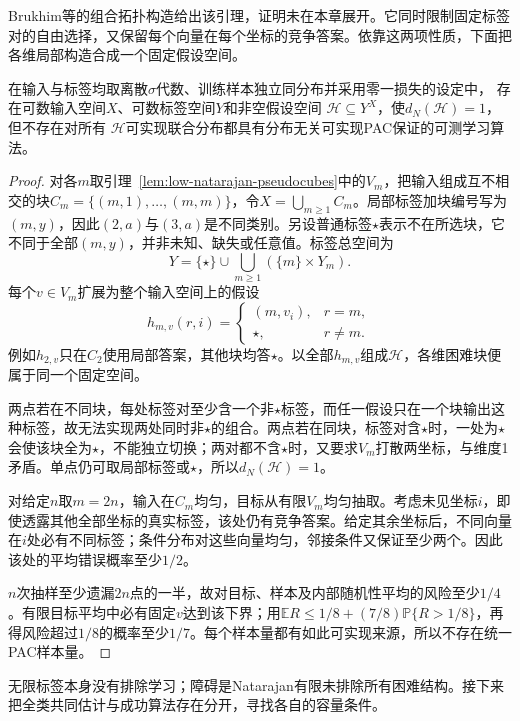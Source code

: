 Brukhim等的组合拓扑构造给出该引理，证明未在本章展开。它同时限制固定标签对的自由选择，又保留每个向量在每个坐标的竞争答案。依靠这两项性质，下面把各维局部构造合成一个固定假设空间。

\begin{theorem}[无限标签下有限Natarajan维并不充分]
\label{thm:natarajan-infinite-counterexample}
在输入与标签均取离散$\sigma$代数、训练样本独立同分布并采用零一损失的设定中，
存在可数输入空间$X$、可数标签空间$Y$和非空假设空间
$\mathcal H\subseteq Y^X$，使$d_N(\mathcal H)=1$，但不存在对所有
$\mathcal H$可实现联合分布都具有分布无关可实现PAC保证的可测学习算法。
\end{theorem}

\begin{proof}
对各$m$取引理~\ref{lem:low-natarajan-pseudocubes}中的$V_m$，把输入组成互不相交的块$C_m=\{(m,1),\ldots,(m,m)\}$，令$X=\bigcup_{m\geq1}C_m$。局部标签加块编号写为$(m,y)$，因此$(2,a)$与$(3,a)$是不同类别。另设普通标签$\star$表示不在所选块，它不同于全部$(m,y)$，并非未知、缺失或任意值。标签总空间为
\[
 Y=\{\star\}\cup\bigcup_{m\geq1}(\{m\}\times Y_m).
\]
每个$v\in V_m$扩展为整个输入空间上的假设
\[
 h_{m,v}(r,i)=
 \begin{cases}
 (m,v_i),&r=m,\\
 \star,&r\neq m.
 \end{cases}
\]
例如$h_{2,v}$只在$C_2$使用局部答案，其他块均答$\star$。以全部$h_{m,v}$组成$\mathcal H$，各维困难块便属于同一个固定空间。

两点若在不同块，每处标签对至少含一个非$\star$标签，而任一假设只在一个块输出这种标签，故无法实现两处同时非$\star$的组合。两点若在同块，标签对含$\star$时，一处为$\star$会使该块全为$\star$，不能独立切换；两对都不含$\star$时，又要求$V_m$打散两坐标，与维度1矛盾。单点仍可取局部标签或$\star$，所以$d_N(\mathcal H)=1$。

对给定$n$取$m=2n$，输入在$C_m$均匀，目标从有限$V_m$均匀抽取。考虑未见坐标$i$，即使透露其他全部坐标的真实标签，该处仍有竞争答案。给定其余坐标后，不同向量在$i$处必有不同标签；条件分布对这些向量均匀，邻接条件又保证至少两个。因此该处的平均错误概率至少$1/2$。

$n$次抽样至少遗漏$2n$点的一半，故对目标、样本及内部随机性平均的风险至少$1/4$。有限目标平均中必有固定$v$达到该下界；用$\mathbb E R\leq1/8+(7/8)\mathbb P\{R>1/8\}$，再得风险超过$1/8$的概率至少$1/7$。每个样本量都有如此可实现来源，所以不存在统一PAC样本量。
\end{proof}

无限标签本身没有排除学习；障碍是Natarajan有限未排除所有困难结构。接下来把全类共同估计与成功算法存在分开，寻找各自的容量条件。

